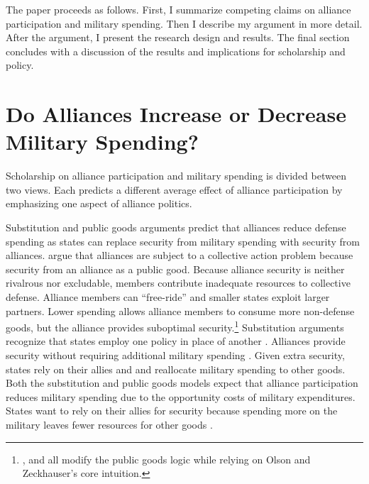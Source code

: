 \documentclass[12pt]{article}
\begin{document}
The paper proceeds as follows. 
First, I summarize competing claims on alliance participation and military spending. 
Then I describe my argument in more detail. 
After the argument, I present the research design and results. 
The final section concludes with a discussion of the results and implications for scholarship and policy.  



\section*{Do Alliances Increase or Decrease Military Spending?}


Scholarship on alliance participation and military spending is divided between two views.
Each predicts a different average effect of alliance participation by emphasizing one aspect of alliance politics.   


Substitution and public goods arguments predict that alliances reduce defense spending as states can replace security from military spending with security from alliances.
\citet{OlsonZeckhauser1966} argue that alliances are subject to a collective action problem because security from an alliance as a public good.
Because alliance security is neither rivalrous nor excludable, members contribute inadequate resources to collective defense. 
Alliance members can ``free-ride'' and smaller states exploit larger partners. 
Lower spending allows alliance members to consume more non-defense goods, but the alliance provides suboptimal security.\footnote{\citet{SandlerForbes1980}, \citet{Oneal1990} and \citet{SandlerHartley2001} all modify the public goods logic while relying on Olson and Zeckhauser's core intuition.} 
Substitution arguments recognize that states employ one policy in place of another \citep{MostStarr1989}.
Alliances provide security without requiring additional military spending \citep{Morrow1993, Conybeare1994}. 
Given extra security, states rely on their allies and and reallocate military spending to other goods. 
Both the substitution and public goods models expect that alliance participation reduces military spending due to the opportunity costs of military expenditures. 
States want to rely on their allies for security because spending more on the military leaves fewer resources for other goods \citep{Fordham1998, Fearon2018}.
\end{document}
